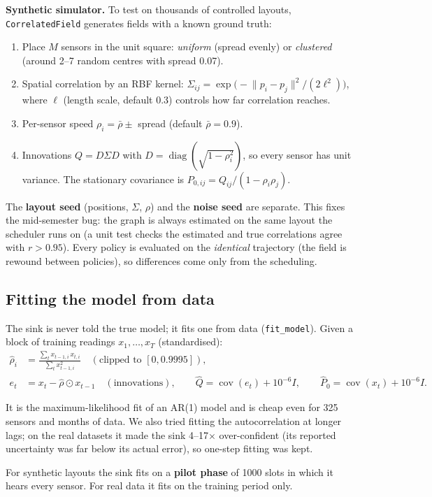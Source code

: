 \textbf{Synthetic simulator.} To test on thousands of controlled layouts, \texttt{CorrelatedField} generates fields
with a known ground truth:
\begin{enumerate}
  \item Place $M$ sensors in the unit square: \emph{uniform} (spread evenly) or \emph{clustered} (around 2--7 random
        centres with spread 0.07).
  \item Spatial correlation by an RBF kernel: $\Sigma_{ij}=\exp\!\big(-\lVert p_i-p_j\rVert^2/(2\ell^2)\big)$, where
        $\ell$ (length scale, default 0.3) controls how far correlation reaches.
  \item Per-sensor speed $\rho_i = \bar\rho \pm$ spread (default $\bar\rho=0.9$).
  \item Innovations $Q = D\Sigma D$ with $D=\operatorname{diag}(\sqrt{1-\rho_i^2})$, so every sensor has unit variance.
        The stationary covariance is $P_{0,ij}=Q_{ij}/(1-\rho_i\rho_j)$.
\end{enumerate}
The \textbf{layout seed} (positions, $\Sigma$, $\rho$) and the \textbf{noise seed} are separate. This fixes the
mid-semester bug: the graph is always estimated on the same layout the scheduler runs on (a unit test checks the
estimated and true correlations agree with $r>0.95$). Every policy is evaluated on the \emph{identical} trajectory
(the field is rewound between policies), so differences come only from the scheduling.

\subsection{Fitting the model from data}

The sink is never told the true model; it fits one from data (\texttt{fit\_model}). Given a block of training
readings $x_1,\dots,x_T$ (standardised):
\begin{align*}
  \hat\rho_i &= \frac{\sum_t x_{t-1,i}\,x_{t,i}}{\sum_t x_{t-1,i}^2}\quad(\text{clipped to }[0,0.9995]),\\
  e_t &= x_t - \hat\rho \odot x_{t-1}\quad(\text{innovations}),\qquad
  \hat Q = \operatorname{cov}(e_t)+10^{-6}I,\qquad \hat P_0=\operatorname{cov}(x_t)+10^{-6}I.
\end{align*}
\begin{whybox}
It is the maximum-likelihood fit of an AR(1) model and is cheap even for 325 sensors and months of data. We also tried
fitting the autocorrelation at longer lags; on the real datasets it made the sink 4--17$\times$ over-confident (its
reported uncertainty was far below its actual error), so one-step fitting was kept.
\end{whybox}
For synthetic layouts the sink fits on a \textbf{pilot phase} of 1000 slots in which it hears every sensor. For real
data it fits on the training period only.


